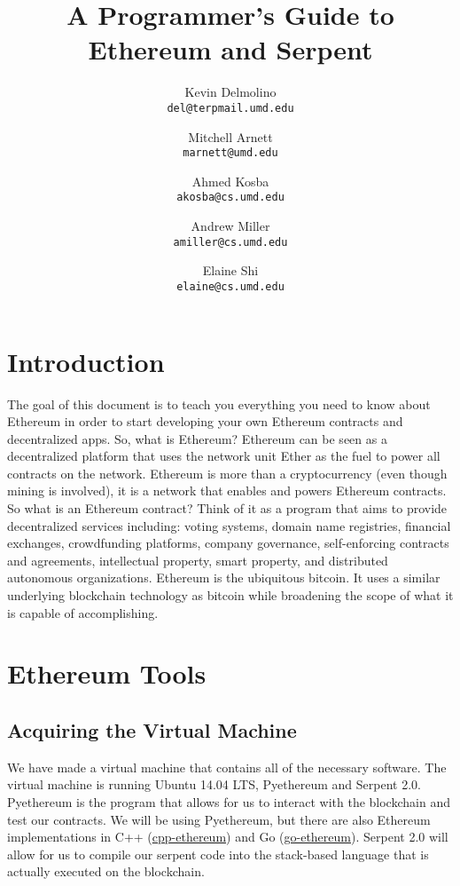 \documentclass[12pt]{article}
\begin{document}
\title{A Programmer's Guide to Ethereum and Serpent}

\author{
  Kevin Delmolino\\
  \texttt{del@terpmail.umd.edu}
  \and
  Mitchell Arnett\\
  \texttt{marnett@umd.edu}
  \and
  Ahmed Kosba\\
  \texttt{akosba@cs.umd.edu}
  \and
  Andrew Miller\\
  \texttt{amiller@cs.umd.edu}
  \and
  Elaine Shi\\
  \texttt{elaine@cs.umd.edu}
}

\maketitle

\setcounter{tocdepth}{5}
\tableofcontents

\section{Introduction}
The goal of this document is to teach you everything you need to know about Ethereum in order to start developing your own Ethereum contracts and decentralized apps. 
So, what is Ethereum? Ethereum can be seen as a decentralized platform that uses the network unit Ether as the fuel to power all contracts on the network. Ethereum is more than a cryptocurrency (even though mining is involved), it is a network that enables and powers Ethereum contracts. So what is an Ethereum contract? Think of it as a program that aims to provide decentralized services including: voting systems, domain name registries, financial exchanges, crowdfunding platforms, company governance, self-enforcing contracts and agreements, intellectual property, smart property, and distributed autonomous organizations. Ethereum is the ubiquitous bitcoin. It uses a similar underlying blockchain technology as bitcoin while broadening the scope of what it is capable of accomplishing. \cite{Shi2015,EthereumWhitePaper}

\section{Ethereum Tools}
\subsection{Acquiring the Virtual Machine}
We have made a virtual machine that contains all of the necessary software. The virtual machine is running Ubuntu 14.04 LTS, Pyethereum and Serpent 2.0. Pyethereum is the program that allows for us to interact with the blockchain and test our contracts. We will be using Pyethereum, but there are also Ethereum implementations in C++ (\href{https://github.com/ethereum/cpp-ethereum}{cpp-ethereum}) and Go (\href{https://github.com/ethereum/go-ethereum}{go-ethereum}). Serpent 2.0 will allow for us to compile our serpent code into the stack-based language that is actually executed on the blockchain. 
\end{document}
